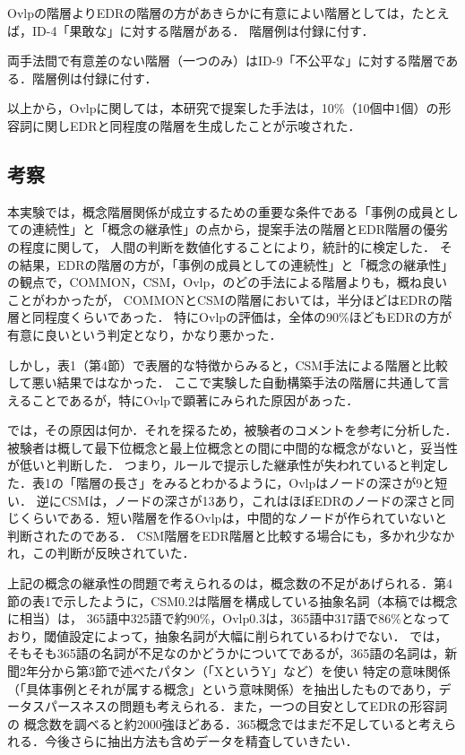 \documentclass[japanese]{jnlp_1.4}
\begin{document}
Ovlpの階層よりEDRの階層の方があきらかに有意によい階層としては，たとえば，ID-4「果敢な」に対する階層がある．
階層例は付録に付す．

両手法間で有意差のない階層（一つのみ）はID-9「不公平な」に対する階層である．階層例は付録に付す．

以上から，Ovlpに関しては，本研究で提案した手法は，10\%（10個中1個）の形容詞に関しEDRと同程度の階層を生成したことが示唆された．


\subsection{考察}

本実験では，概念階層関係が成立するための重要な条件である「事例の成員としての連続性」と「概念の継承性」の点から，提案手法の階層とEDR階層の優劣の程度に関して，
人間の判断を数値化することにより，統計的に検定した．
その結果，EDRの階層の方が，「事例の成員としての連続性」と「概念の継承性」の観点で，COMMON，CSM，Ovlp，のどの手法による階層よりも，概ね良いことがわかったが，
COMMONとCSMの階層においては，半分ほどはEDRの階層と同程度くらいであった．
特にOvlpの評価は，全体の90\%ほどもEDRの方が有意に良いという判定となり，かなり悪かった．

しかし，表1（第4節）で表層的な特徴からみると，CSM手法による階層と比較して悪い結果ではなかった．
ここで実験した自動構築手法の階層に共通して言えることであるが，特にOvlpで顕著にみられた原因があった．

では，その原因は何か．それを探るため，被験者のコメントを参考に分析した．
被験者は概して最下位概念と最上位概念との間に中間的な概念がないと，妥当性が低いと判断した．
つまり，ルールで提示した継承性が失われていると判定した．表1の「階層の長さ」をみるとわかるように，Ovlpはノードの深さが9と短い．
逆にCSMは，ノードの深さが13あり，これはほぼEDRのノードの深さと同じくらいである．短い階層を作るOvlpは，中間的なノードが作られていないと判断されたのである．
CSM階層をEDR階層と比較する場合にも，多かれ少なかれ，この判断が反映されていた．

上記の概念の継承性の問題で考えられるのは，概念数の不足があげられる．第4節の表1で示したように，CSM0.2は階層を構成している抽象名詞（本稿では概念に相当）は，
365語中325語で約90\%，Ovlp0.3は，365語中317語で86\%となっており，閾値設定によって，抽象名詞が大幅に削られているわけでない．
では，そもそも365語の名詞が不足なのかどうかについてであるが，365語の名詞は，新聞2年分から第3節で述べたパタン（「XというY」など）を使い
特定の意味関係（「具体事例とそれが属する概念」という意味関係）を抽出したものであり，データスパースネスの問題も考えられる．また，一つの目安としてEDRの形容詞の
概念数を調べると約2000強ほどある．365概念ではまだ不足していると考えられる．今後さらに抽出方法も含めデータを精査していきたい．
\end{document}
